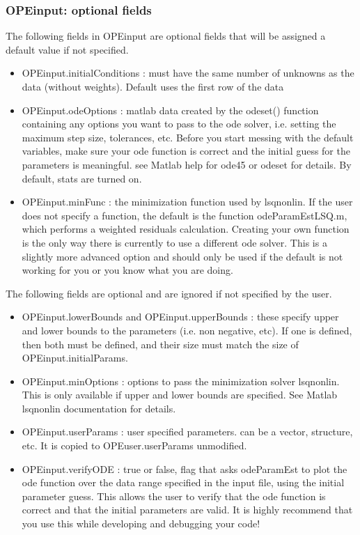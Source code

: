 \documentclass[10pt]{article}
\theoremstyle{plain}
\begin{document}
\subsubsection{OPEinput: optional fields}
The following fields in OPEinput are optional fields that will be
assigned a default value if not specified.

\begin{itemize}
\item OPEinput.initialConditions : must have the same number of unknowns as
the data (without weights). Default uses the first row of the data

\item OPEinput.odeOptions : matlab data created by the odeset()
function containing any options you want to pass to the ode
solver, i.e. setting the maximum step size, tolerances, etc. Before you
start messing with the default variables, make sure your ode function
is correct and the initial guess for the parameters is meaningful. see
Matlab help for ode45 or odeset for details. By default, stats are
turned on.

\item OPEinput.minFunc : the minimization function used by lsqnonlin. 
If the user does not specify a function, the default is the function
odeParamEstLSQ.m, which performs a weighted residuals
calculation. Creating your own function is the only way there is
currently to use a different ode solver. This is a slightly more
advanced option and should only be used if the default is not working
for you or you know what you are doing.

\end{itemize}

The following fields are optional and are ignored if not specified by the user.
\begin{itemize}
\item OPEinput.lowerBounds and OPEinput.upperBounds : these specify upper 
and lower bounds to the parameters (i.e. non negative, etc). If one is
defined, then both must be defined, and their size must match the size
of OPEinput.initialParams.

\item OPEinput.minOptions : options to pass the minimization solver lsqnonlin. 
This is only available if upper and lower bounds are specified. See
Matlab lsqnonlin documentation for details.
 
\item OPEinput.userParams : user specified parameters. can be a vector, 
structure, etc. It is copied to OPEuser.userParams unmodified. 

\item OPEinput.verifyODE : true or false, flag that asks odeParamEst 
to plot the ode function over the data range specified in the input
file, using the initial parameter guess. This allows the user to
verify that the ode function is correct and that the initial
parameters are valid. It is highly recommend that you use this while
developing and debugging your code!

\end{itemize}
\end{document}
